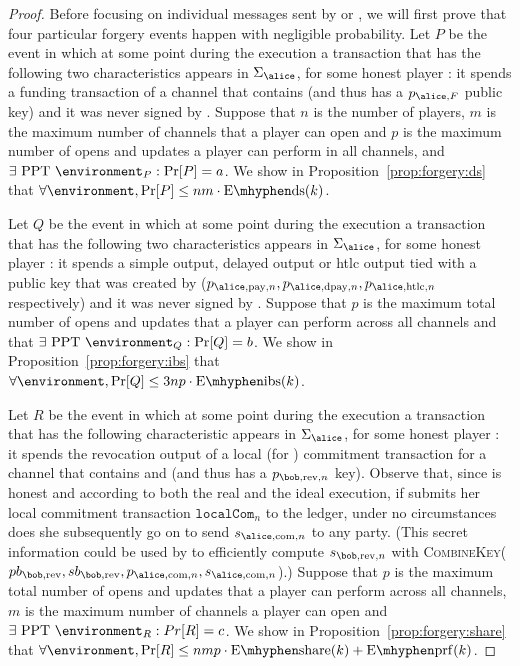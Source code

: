 \begin{proof}
  Before focusing on individual messages sent by \environment{} or \adversary,
  we will first prove that four particular forgery events happen with negligible
  probability. Let $P$ be the event in which at some point during the execution
  a transaction that has the following two characteristics appears in
  $\Sigma_{\alice}$, for some honest player \alice: it spends a funding
  transaction of a channel that contains \alice{} (and thus has a $p_{\alice,
  F}$ public key) and it was never signed by \alice. Suppose that $n$ is the
  number of players, $m$ is the maximum number of channels that a player can
  open and $p$ is the maximum number of opens and updates a player can perform
  in all channels, and $\exists \text{ PPT } \environment_P: \Pr[P] = a$. We
  show in Proposition~\ref{prop:forgery:ds} that $\forall \environment, \Pr[P]
  \leq nm \cdot \mathrm{E \mhyphen ds}(k)$.

  Let $Q$ be the event in which at some point during the execution a transaction
  that has the following two characteristics appears in $\Sigma_{\alice}$, for
  some honest player \alice: it spends a simple output, delayed output or htlc
  output tied with a public key that was created by \alice{} ($p_{\alice,
  \mathrm{pay}, n}, p_{\alice, \mathrm{dpay}, n}, p_{\alice, \mathrm{htlc}, n}$
  respectively) and it was never signed by \alice. Suppose that $p$ is the
  maximum total number of opens and updates that a player can perform across all
  channels and that
  $\exists \text{ PPT } \environment_Q: \Pr[Q] = b$. We show
  in Proposition~\ref{prop:forgery:ibs} that $\forall \environment, \Pr[Q] \leq
  3np \cdot \mathrm{E \mhyphen ibs}(k)$.

  Let $R$ be the event in which at some point during the execution a transaction
  that has the following characteristic appears in $\Sigma_{\alice}$, for some
  honest player \alice: it spends the revocation output of a local (for
  \alice{}) commitment transaction for a channel that contains \alice{} and
  \bob{} (and thus has a $p_{\bob, \mathrm{rev}, n}$ key). Observe that, since
  \alice{} is honest and according to both the real and the ideal execution, if
  \alice{} submits her local commitment transaction $\mathtt{localCom}_n$ to the
  ledger, under no circumstances does she subsequently go on to send $s_{\alice,
  \mathrm{com}, n}$ to any party. (This secret information could be used by
  \bob{} to efficiently compute $s_{\bob, \mathrm{rev}, n}$ with
  \textsc{CombineKey}($pb_{\bob, \mathrm{rev}}, sb_{\bob, \mathrm{rev}},
  p_{\alice, \mathrm{com}, n}, s_{\alice, \mathrm{com}, n}$).) Suppose that $p$
  is the maximum total number of opens and updates that a player can perform
  across all channels, $m$ is the maximum number of channels a player can open
  and $\exists \text{ PPT } \environment_R: Pr[R] = c$. We show in
  Proposition~\ref{prop:forgery:share} that $\forall \environment, \Pr[R] \leq
  nmp \cdot \mathrm{E \mhyphen share}(k) + \mathrm{E \mhyphen prf}(k)$.


\end{proof}
